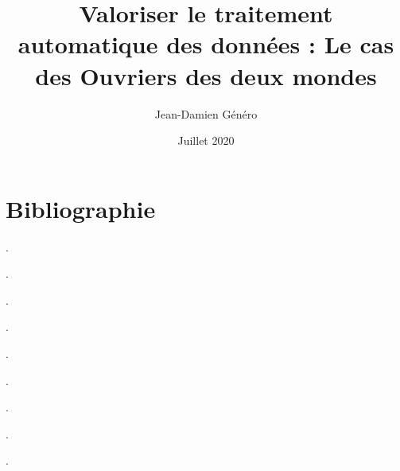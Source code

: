 \documentclass[a4paper,twoside,12pt]{book}
\title{Valoriser le traitement automatique des données : Le cas des Ouvriers des deux mondes}
\author{Jean-Damien Généro}
\date{Juillet 2020}
\begin{document}
\frontmatter

\clearpage
\thispagestyle{empty}
\cleardoublepage

\clearpage
\thispagestyle{empty}
\cleardoublepage

\clearpage
\thispagestyle{empty}
\cleardoublepage

\clearpage
\thispagestyle{empty}
\cleardoublepage


\mainmatter


\backmatter
\part*{Bibliographie}

\cite{inria}.

\cite{baciocchi}.

\cite{cardoni}.

\cite{chague}.

\cite{chenu}.

\cite{hincker}.

\cite{lefourner}

\cite{lorry}.

\cite{savoye}.

\cite{savoye2}.

\tableofcontents
\end{document}
